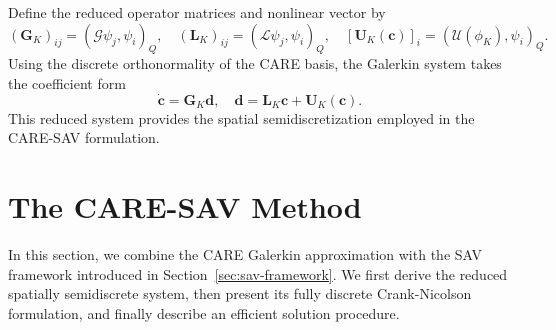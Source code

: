 \documentclass[10pt,reqno]{amsart}
\theoremstyle{remark}
\theoremstyle{definition}
\begin{document}
Define the reduced operator matrices and nonlinear vector by
$$
  (\boldsymbol{G}_K)_{ij}=(\mathcal{G}\psi_j,\psi_i)_Q,\quad(\boldsymbol{L}_K)_{ij}=(\mathcal{L}\psi_j,\psi_i)_Q,\quad[\boldsymbol{U}_K(\boldsymbol{c})]_i=(\mathcal{U}(\phi_K),\psi_i)_Q.
$$
Using the discrete orthonormality of the CARE basis, the Galerkin system takes the coefficient form
$$
  \dot{\boldsymbol{c}}=\boldsymbol{G}_K\boldsymbol{d},\quad\boldsymbol{d}=\boldsymbol{L}_K\boldsymbol{c}+\boldsymbol{U}_K(\boldsymbol{c}).
$$
This reduced system provides the spatial semidiscretization employed in the CARE-SAV formulation.

\section{The CARE-SAV Method}
\label{sec:CARE-SAV}
In this section, we combine the CARE Galerkin approximation with the SAV framework introduced in Section~\ref{sec:sav-framework}. We first derive the reduced spatially semidiscrete system, then present its fully discrete Crank-Nicolson formulation, and finally describe an efficient solution procedure.
\end{document}

